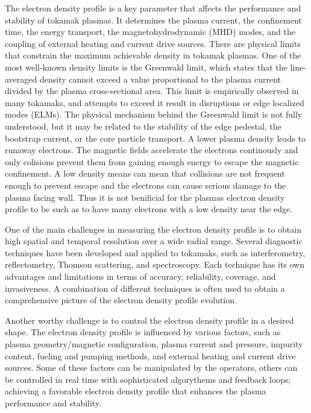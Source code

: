 The electron density profile is a key parameter that affects the performance and stability of tokamak plasmas. It determines the plasma current, the confinement time, the energy transport, the magnetohydrodynamic (MHD) modes, and the coupling of external heating and current drive sources. There are physical limits that constrain the maximum achievable density in tokamak plasmas. One of the most well-known density limits is the Greenwald limit, which states that the line-averaged density cannot exceed a value proportional to the plasma current divided by the plasma cross-sectional area. This limit is empirically observed in many tokamaks, and attempts to exceed it result in disruptions or edge localized modes (ELMs). The physical mechanism behind the Greenwald limit is not fully understood, but it may be related to the stability of the edge pedestal, the bootstrap current, or the core particle transport. A lower plasma density leads to runaway electrons. The magnetic fields accelerate the electrons continously and only colisions prevent them from gaining enough energy to escape the magnetic confinement. A low density means can mean that collisions are not frequent enough to prevent escape and the electrons can cause serious damage to the plasma facing wall. Thus it is not benificial for the plasmas electron density profile to be such as to have many electrons with a low density near the edge. 

One of the main challenges in measuring the electron density profile is to obtain high spatial and temporal resolution over a wide radial range. Several diagnostic techniques have been developed and applied to tokamaks, such as interferometry, reflectometry, Thomson scattering, and spectroscopy. Each technique has its own advantages and limitations in terms of accuracy, reliability, coverage, and invasiveness. A combination of different techniques is often used to obtain a comprehensive picture of the electron density profile evolution.

Another worthy challenge is to control the electron density profile in a desired shape. The electron density profile is influenced by various factors, such as plasma geometry/magnetic configuration, plasma current and pressure, impurity content, fueling and pumping methods, and external heating and current drive sources. Some of these factors can be manipulated by the operators, others can be controlled in real time with sophisticated algorythems and feedback loops; achieving a favorable electron density profile that enhances the plasma performance and stability.

